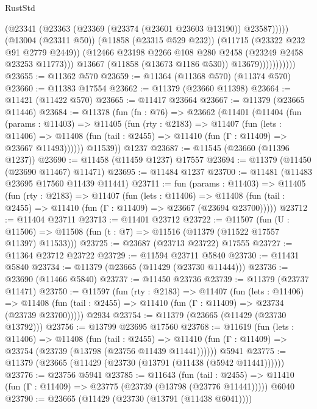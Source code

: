 \begin{lexlean}{RustStd}
\begin{coremodule}
                                (@23341 (@23363 (@23369 (@23374 (@23601 @23603 @13190)) @23587)))))
                            (@13004 (@23311 @50))
                            (@11858 (@23315 @529 @232))
                            (@11715 (@23322 @232 @91 @2779 @2449))
                            (@12466 @23198 @2266 @108 @280 @2458 (@23249 @2458 @23253 @11773)))
                          @13667
                          (@11858 (@13673 @1186 @530))
                          @13679)))))))))))
@23655 := @11362 @570
@23659 := @11364 (@11368 @570) (@11374 @570)
@23660 := @11383 @17554
@23662 := @11379 (@23660 @11398)
@23664 := @11421 (@11422 @570)
@23665 := @11417 @23664
@23667 := @11379 (@23665 @11446)
@23684 := @11378
    (fun (fn : @76) =>
    @23662
      (@11401
        (@11404
          (fun (params : @11403) =>
          @11405
            (fun (rty : @2183) =>
            @11407
              (fun (lets : @11406) =>
              @11408 (fun (tail : @2455) => @11410 (fun (Γ : @11409) => @23667 @11493))))))
        @11539))
    @1237
@23687 := @11545 (@23660 (@11396 @1237))
@23690 := @11458 (@11459 @1237) @17557
@23694 := @11379 (@11450 (@23690 @11467) @11471)
@23695 := @11484 @1237
@23700 := @11481 (@11483 @23695 @17560 @11439 @11441)
@23711 := fun (params : @11403) =>
  @11405
    (fun (rty : @2183) =>
    @11407
      (fun (lets : @11406) =>
      @11408 (fun (tail : @2455) => @11410 (fun (Γ : @11409) => @23667 (@23694 @23700)))))
@23712 := @11404 @23711
@23713 := @11401 @23712
@23722 := @11507
    (fun (U : @11506) => @11508 (fun (t : @7) => @11516 (@11379 (@11522 @17557 @11397) @11533)))
@23725 := @23687 (@23713 @23722) @17555
@23727 := @11364 @23712 @23722
@23729 := @11594 @23711 @5840
@23730 := @11431 @5840
@23734 := @11379 (@23665 (@11429 (@23730 @11444)))
@23736 := @23690 (@11466 @5840)
@23737 := @11450 @23736
@23739 := @11379 (@23737 @11471)
@23750 := @11597
    (fun (rty : @2183) =>
    @11407
      (fun (lets : @11406) =>
      @11408 (fun (tail : @2455) => @11410 (fun (Γ : @11409) => @23734 (@23739 @23700)))))
    @2934
@23754 := @11379 (@23665 (@11429 (@23730 @13792)))
@23756 := @13799 @23695 @17560
@23768 := @11619
    (fun (lets : @11406) =>
    @11408
      (fun (tail : @2455) =>
      @11410 (fun (Γ : @11409) => @23754 (@23739 (@13798 (@23756 @11439 @11441))))))
    @5941
@23775 := @11379 (@23665 (@11429 (@23730 (@13791 (@11438 (@5942 @11441))))))
@23776 := @23756 @5941
@23785 := @11643
    (fun (tail : @2455) => @11410 (fun (Γ : @11409) => @23775 (@23739 (@13798 (@23776 @11441)))))
    @6040
@23790 := @23665 (@11429 (@23730 (@13791 (@11438 @6041))))

\end{coremodule}
\end{lexlean}
